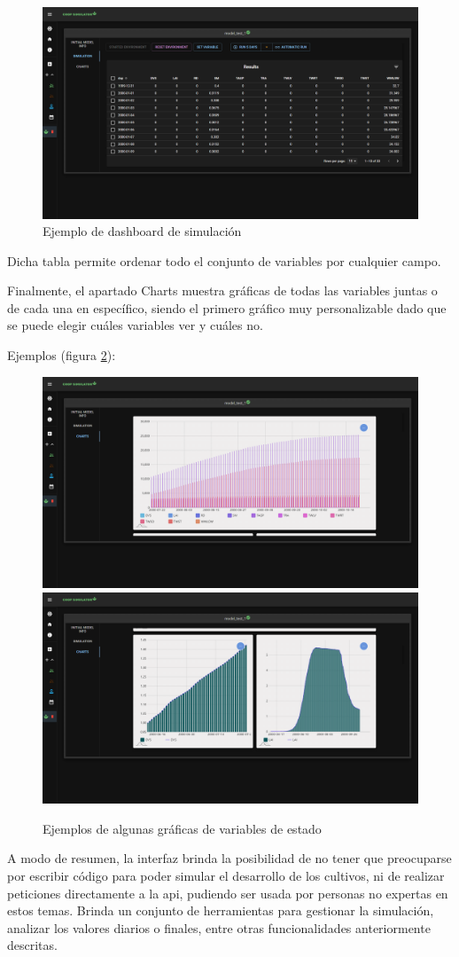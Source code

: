 \begin{figure}[!h]
	\centering
	\includegraphics[width=0.6\linewidth]{Images/table}
	\caption{Ejemplo de dashboard de simulación}
	\label{fig:table}
\end{figure}

Dicha tabla permite ordenar todo el conjunto de variables por cualquier campo.

Finalmente, el apartado Charts muestra gráficas de todas las variables juntas o de cada una en específico, siendo el primero gráfico muy personalizable dado que se puede elegir cuáles variables ver y cuáles no.

Ejemplos (figura \ref{fig:tables}):\\

\begin{figure}[!h]
	\centering
	\includegraphics[width=0.4\linewidth]{Images/table1}
	\includegraphics[width=0.4\linewidth]{Images/table2}
	\caption{Ejemplos de algunas gráficas de variables de estado}
	\label{fig:tables}
\end{figure}


A modo de resumen, la interfaz brinda la posibilidad de no tener que preocuparse por escribir código para poder simular el desarrollo de los cultivos, ni de realizar peticiones directamente a la api, pudiendo ser usada por personas no expertas en estos temas. Brinda un conjunto de herramientas para gestionar la simulación, analizar los valores diarios o finales, entre otras funcionalidades anteriormente descritas.

